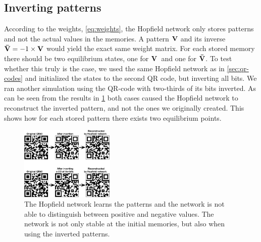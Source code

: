\subsection{Inverting patterns}
According to the weights, \cref{eq:weights}, the Hopfield network only stores patterns and not the actual values in the memories. A pattern $\bf V$ and its inverse $\mathbf{\bar{V}} = -1 \times \bf V$ would yield the exact same weight matrix. For each stored memory there should be two equilibrium states, one for $\bf V$ and one for $\bf \bar{V}$. To test whether this truly is the case, we used the same Hopfield network as in \cref{sec:qr-codes} and initialized the states to the second QR code, but inverting all bits. We ran another simulation using the QR-code with two-thirds of its bits inverted. As can be seen from the results in \cref{fig:inverted-qr} both cases caused the Hopfield network to reconstruct the inverted pattern, and not the ones we originally created. This shows how for each stored pattern there exists two equilibrium points.
\begin{figure}[H]
    \centering
        \includegraphics[width=0.4\textwidth]{figs/qr-inverted}
        \caption{The Hopfield network learns the patterns and the network is not able to distinguish between positive and negative values. The network is not only stable at the initial memories, but also when using the inverted patterns.}
        \label{fig:inverted-qr}
\end{figure}